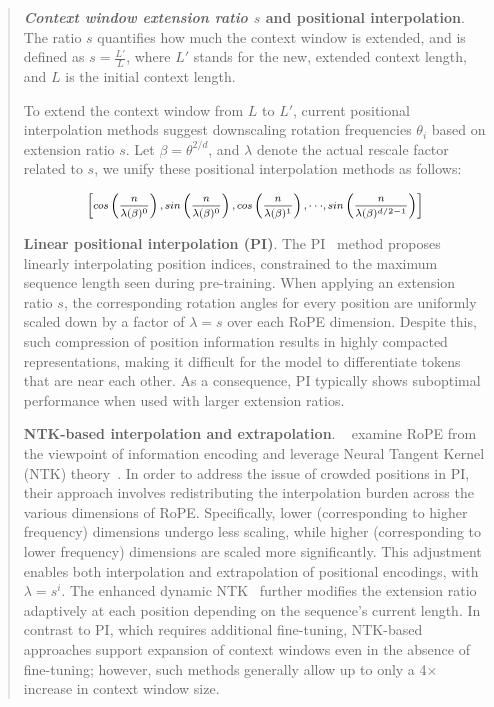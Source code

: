 \begin{abstract}
\textbf{\emph{Context window extension ratio $s$} and positional interpolation}. The ratio $s$ quantifies how much the context window is extended, and is defined as $s=\frac{L'}{L}$, where $L'$ stands for the new, extended context length, and $L$ is the initial context length.

To extend the context window from $L$ to $L'$, current positional interpolation methods suggest downscaling rotation frequencies $\theta_i$ based on extension ratio $s$. Let $\beta=\theta^{2/d}$, and $\lambda$ denote the actual rescale factor related to $s$, we   unify these positional interpolation methods as follows:

\begin{equation}	
	\fontsize{7.5}{7.5} \selectfont
	\label{eq:unified_rope}
	\begin{aligned}
		\left[cos\left(\frac{n}{\lambda(\beta)^0}\right), sin \left(\frac{n}{\lambda(\beta)^0}\right), cos\left(\frac{n}{\lambda(\beta)^1}\right), \cdot\cdot\cdot,  sin \left(\frac{n}{\lambda(\beta)^{d/2-1}}\right) \right]   
	\end{aligned}
\end{equation}

\textbf{Linear positional interpolation (PI)}. The PI~\cite{pi} method proposes linearly interpolating position indices, constrained to the maximum sequence length seen during pre-training. When applying an extension ratio $s$, the corresponding rotation angles for every position are uniformly scaled down by a factor of $\lambda=s$ over each RoPE dimension. Despite this, such compression of position information results in highly compacted representations, making it difficult for the model to differentiate tokens that are near each other. As a consequence, PI typically shows suboptimal performance when used with larger extension ratios.

\textbf{NTK-based interpolation and extrapolation}. ~\cite{ntk,dynamicntk} examine RoPE from the viewpoint of information encoding and leverage Neural Tangent Kernel (NTK) theory~\cite{jacot2018neural,tancik2020fourier}. In order to address the issue of crowded positions in PI, their approach involves redistributing the interpolation burden across the various dimensions of RoPE. Specifically, lower (corresponding to higher frequency) dimensions undergo less scaling, while higher (corresponding to lower frequency) dimensions are scaled more significantly. This adjustment enables both interpolation and extrapolation of positional encodings, with $\lambda=s^{i}$. The enhanced dynamic NTK~\cite{dynamicntk} further modifies the extension ratio adaptively at each position depending on the sequence's current length. In contrast to PI, which requires additional fine-tuning, NTK-based approaches support expansion of context windows even in the absence of fine-tuning; however, such methods generally allow up to only a 4$\times$ increase in context window size.


\end{abstract}
